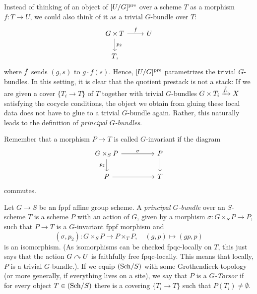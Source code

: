 \documentclass[a4paper,11pt]{article}
\begin{document}
Instead of thinking of an object of $[U/G]^{\mathrm{pre}}$ over a scheme $T$ 
as a morphism $f: T \to U$, we could also think of it as a trivial 
$G$-bundle over $T$:
\[\begin{tikzcd}[ampersand replacement=\&]
	{G \times T} \& U \\
	T,
	\arrow["{p_2}", from=1-1, to=2-1]
	\arrow["\tilde f", from=1-1, to=1-2]
\end{tikzcd}\]
where $\Tilde f$ sends $(g,s)$ to $g \cdot f(s)$. Hence, 
$[U/G]^{\mathrm{pre}}$ parametrizes the trivial $G$-bundles. In this setting,
it is clear that the quotient prestack is not a stack: If we are given 
a cover $\{T_i \to T\}$ of $T$ together with trivial $G$-bundles 
$G \times T_i \xrightarrow{\tilde f_i} X$ satisfying the cocycle conditions, the object 
we obtain from gluing these local data does not have to glue to a trivial
$G$-bundle again. Rather, this naturally leads to the definition of 
\textit{principal $G$-bundles}. 

Remember that a morphism $P \to T$ is called $G$-invariant if the diagram
\[\begin{tikzcd}[ampersand replacement=\&]
	{G \times_S P} \&\& P \\
	P \&\& T
	\arrow["\sigma", from=1-1, to=1-3]
	\arrow[from=1-3, to=2-3]
	\arrow[from=2-1, to=2-3]
	\arrow["{p_2}"', from=1-1, to=2-1]
\end{tikzcd}\]
    commutes.

\begin{defi}
    Let $G \to S$ be an fppf affine group scheme. A \textit{principal
    $G$-bundle} over an $S$-scheme $T$ is a 
    scheme $P$ with an action of $G$, given by a morphism
    $\sigma: G \times_S P \to P$, such that 
    $P \to T$ is a $G$-invariant fppf morphism and 
    \begin{equation*}
        (\sigma, p_2): G \times_S P \to P \times_T P, \quad
        (g,p) \mapsto (gp, p)
    \end{equation*}
    is an isomorphism. (As isomorphisms can be checked fpqc-locally on $T$, this just
    says that the action $G \curvearrowright U$ is faithfully free fpqc-locally. This 
    means that locally, $P$ is a trivial $G$-bundle.). If we equip $(\mathrm{Sch}/ S)$
    with some Grothendieck-topology (or more generally, if everything lives on
    a site), we say that $P$ is a \textit{$G$-Torsor} if for every object $T
    \in (\mathrm{Sch}/ S)$ there is a covering $\{T_i \to T\}$ such that $P(T_i) \neq
    \emptyset$. 
\end{defi}
\end{document}

